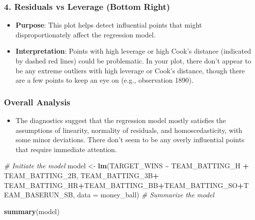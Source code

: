 \documentclass[
]{article}
\newenvironment{Shaded}{\begin{snugshade}}{\end{snugshade}}
\newcommand{\AttributeTok}[1]{\textcolor[rgb]{0.13,0.29,0.53}{#1}}
\newcommand{\CommentTok}[1]{\textcolor[rgb]{0.56,0.35,0.01}{\textit{#1}}}
\newcommand{\FunctionTok}[1]{\textcolor[rgb]{0.13,0.29,0.53}{\textbf{#1}}}
\newcommand{\NormalTok}[1]{#1}
\newcommand{\OtherTok}[1]{\textcolor[rgb]{0.56,0.35,0.01}{#1}}
\newcommand{\SpecialCharTok}[1]{\textcolor[rgb]{0.81,0.36,0.00}{\textbf{#1}}}
\providecommand{\tightlist}{%
  \setlength{\itemsep}{0pt}\setlength{\parskip}{0pt}}
\begin{document}
\hypertarget{residuals-vs-leverage-bottom-right}{%
\subsubsection{\texorpdfstring{4. \textbf{Residuals vs Leverage (Bottom
Right)}}{4. Residuals vs Leverage (Bottom Right)}}\label{residuals-vs-leverage-bottom-right}}

\begin{itemize}
\tightlist
\item
  \textbf{Purpose}: This plot helps detect influential points that might
  disproportionately affect the regression model.
\item
  \textbf{Interpretation}: Points with high leverage or high Cook's
  distance (indicated by dashed red lines) could be problematic. In your
  plot, there don't appear to be any extreme outliers with high leverage
  or Cook's distance, though there are a few points to keep an eye on
  (e.g., observation 1890).
\end{itemize}

\hypertarget{overall-analysis}{%
\subsubsection{\texorpdfstring{\textbf{Overall
Analysis}}{Overall Analysis}}\label{overall-analysis}}

\begin{itemize}
\tightlist
\item
  The diagnostics suggest that the regression model mostly satisfies the
  assumptions of linearity, normality of residuals, and
  homoscedasticity, with some minor deviations. There don't seem to be
  any overly influential points that require immediate attention.
\end{itemize}

\begin{Shaded}
\begin{Highlighting}[]
\CommentTok{\# Initiate the model}
\NormalTok{model }\OtherTok{\textless{}{-}} \FunctionTok{lm}\NormalTok{(TARGET\_WINS }\SpecialCharTok{\textasciitilde{}}\NormalTok{ TEAM\_BATTING\_H }\SpecialCharTok{+}\NormalTok{ TEAM\_BATTING\_2B, TEAM\_BATTING\_3B}\SpecialCharTok{+}
\NormalTok{              TEAM\_BATTING\_HR}\SpecialCharTok{+}\NormalTok{TEAM\_BATTING\_BB}\SpecialCharTok{+}\NormalTok{TEAM\_BATTING\_SO}\SpecialCharTok{+}\NormalTok{TEAM\_BASERUN\_SB,}
            \AttributeTok{data =}\NormalTok{ money\_ball)}
\CommentTok{\# Summarize the model }

\FunctionTok{summary}\NormalTok{(model)}
\end{Highlighting}
\end{Shaded}
\end{document}

